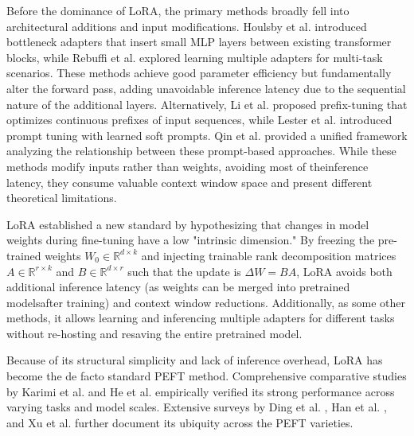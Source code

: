 \documentclass[a4paper,14pt]{extarticle}
\begin{document}
    Before the dominance of LoRA, the primary methods broadly fell into architectural additions and input modifications. 
    Houlsby et al. \cite{houlsby2019parameter} introduced bottleneck adapters that insert small MLP layers between existing transformer blocks, while Rebuffi et al. \cite{rebuffi2017learning} explored learning multiple adapters for multi-task scenarios. 
    These methods achieve good parameter efficiency but fundamentally alter the forward pass, adding unavoidable inference latency due to the sequential nature of the additional layers. 
    Alternatively, Li et al. \cite{li2021prefix} proposed prefix-tuning that optimizes continuous prefixes of input sequences, while Lester et al. \cite{lester2021power} introduced prompt tuning with learned soft prompts. Qin et al. \cite{qin2022towards} provided a unified framework analyzing the relationship between these prompt-based approaches. 
    While these methods modify inputs rather than weights, avoiding most of theinference latency, they consume valuable context window space and present different theoretical limitations.

    LoRA \cite{hu2021loralowrankadaptationlarge} established a new standard by hypothesizing that changes in model weights during fine-tuning have a low "intrinsic dimension." 
    By freezing the pre-trained weights $W_0 \in \mathbb{R}^{d \times k}$ and injecting trainable rank decomposition matrices $A \in \mathbb{R}^{r \times k}$ and $B \in \mathbb{R}^{d \times r}$ such that the update is $\Delta W = BA$, LoRA avoids both additional inference latency (as weights can be merged into pretrained modelsafter training) and context window reductions. Additionally, as some other methods, it allows learning and inferencing multiple adapters for different tasks without re-hosting and resaving the entire pretrained model.

    Because of its structural simplicity and lack of inference overhead, LoRA has become the de facto standard PEFT method. Comprehensive comparative studies by Karimi et al. \cite{karimi2021compelling} and He et al. \cite{he2021effectiveness} empirically verified its strong performance across varying tasks and model scales. Extensive surveys by Ding et al. \cite{ding2023parameter}, Han et al. \cite{han2024survey}, and Xu et al. \cite{xu2023parameter} further document its ubiquity across the PEFT varieties. 
    
\end{document}
